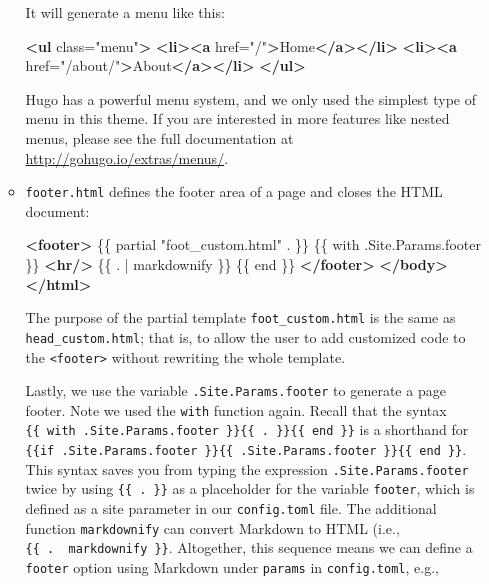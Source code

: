 \documentclass[12pt,]{krantz}
\makeatletter
\newenvironment{Shaded}{\begin{snugshade}}{\end{snugshade}}
\newcommand{\KeywordTok}[1]{\textcolor[rgb]{0.13,0.29,0.53}{\textbf{#1}}}
\newcommand{\StringTok}[1]{\textcolor[rgb]{0.31,0.60,0.02}{#1}}
\newcommand{\OtherTok}[1]{\textcolor[rgb]{0.56,0.35,0.01}{#1}}
\newcommand{\NormalTok}[1]{#1}
\newenvironment{kframe}{%
\medskip{}
\setlength{\fboxsep}{.8em}
 \def\at@end@of@kframe{}%
 \ifinner\ifhmode%
  \def\at@end@of@kframe{\end{minipage}}%
  \begin{minipage}{\columnwidth}%
 \fi\fi%
 \def\FrameCommand##1{\hskip\@totalleftmargin \hskip-\fboxsep
 \colorbox{shadecolor}{##1}\hskip-\fboxsep
     \hskip-\linewidth \hskip-\@totalleftmargin \hskip\columnwidth}%
 \MakeFramed {\advance\hsize-\width
   \@totalleftmargin\z@ \linewidth\hsize
   \@setminipage}}%
 {\par\unskip\endMakeFramed%
 \at@end@of@kframe}
\renewenvironment{Shaded}{\begin{kframe}}{\end{kframe}}
\theoremstyle{definition}
\theoremstyle{definition}
\theoremstyle{definition}
\theoremstyle{remark}
\makeatother
\begin{document}
\begin{itemize}
\begin{itemize}
    It will generate a menu like this:

\begin{Shaded}
\begin{Highlighting}[]
\KeywordTok{<ul}\OtherTok{ class=}\StringTok{"menu"}\KeywordTok{>}
  \KeywordTok{<li><a}\OtherTok{ href=}\StringTok{"/"}\KeywordTok{>}\NormalTok{Home}\KeywordTok{</a></li>}
  \KeywordTok{<li><a}\OtherTok{ href=}\StringTok{"/about/"}\KeywordTok{>}\NormalTok{About}\KeywordTok{</a></li>}
\KeywordTok{</ul>}
\end{Highlighting}
\end{Shaded}

    Hugo has a powerful menu system, and we only used the simplest type
    of menu in this theme. If you are interested in more features like
    nested menus, please see the full documentation at
    \url{http://gohugo.io/extras/menus/}.
  \item
    \texttt{footer.html} defines the footer area of a
    page and closes the HTML document:

\begin{Shaded}
\begin{Highlighting}[]
  \KeywordTok{<footer>}
\NormalTok{  \{\{ partial "foot_custom.html" . \}\}}
\NormalTok{  \{\{ with .Site.Params.footer \}\}}
  \KeywordTok{<hr/>}
\NormalTok{  \{\{ . | markdownify \}\}}
\NormalTok{  \{\{ end \}\}}
  \KeywordTok{</footer>}
  \KeywordTok{</body>}
\KeywordTok{</html>}
\end{Highlighting}
\end{Shaded}

    The purpose of the partial template \texttt{foot\_custom.html} is
    the same as \texttt{head\_custom.html}; that is, to allow the user
    to add customized code to the
    \texttt{\textless{}footer\textgreater{}} without rewriting the whole
    template.

    Lastly, we use the variable \texttt{.Site.Params.footer} to generate
    a page footer. Note we used the \texttt{with} function again. Recall
    that the syntax
    \texttt{\{\{\ with\ .Site.Params.footer\ \}\}\{\{\ .\ \}\}\{\{\ end\ \}\}}
    is a shorthand for
    \texttt{\{\{if\ .Site.Params.footer\ \}\}\{\{\ .Site.Params.footer\ \}\}\{\{\ end\ \}\}}.
    This syntax saves you from typing the expression
    \texttt{.Site.Params.footer} twice by using \texttt{\{\{\ .\ \}\}}
    as a placeholder for the variable \texttt{footer}, which is defined
    as a site parameter in our \texttt{config.toml} file. The additional
    function \texttt{markdownify} can convert Markdown to HTML (i.e.,
    \texttt{\{\{\ .\ \textbar{}\ markdownify\ \}\}}. Altogether, this
    sequence means we can define a \texttt{footer} option using Markdown
    under \texttt{params} in \texttt{config.toml}, e.g.,


\end{itemize}
\end{itemize}
\end{document}
